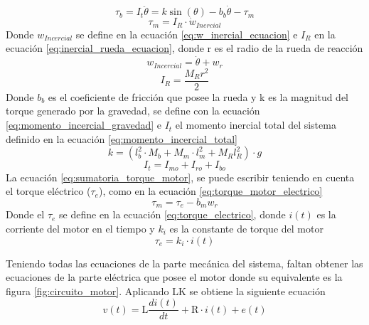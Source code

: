 \documentclass[conference]{IEEEtran}
\begin{document}
\begin{equation}
   \tau_b= I_{t}\ddot{\theta}= k \sin(\theta)-b_b \dot{\theta}-\tau_m
    \label{eq:sumatoria_torque_base}
\end{equation}
\begin{equation}
    \tau_m= I_{R} \cdot \dot{w}_{Inercial}
    \label{eq:sumatoria_torque_motor}
\end{equation}
Donde $w_{Incercial}$ se define en la ecuación \eqref{eq:w_inercial_ecuacion} e $I_R$  en la ecuación \eqref{eq:inercial_rueda_ecuacion}, donde r es el radio de la rueda de reacción
\begin{equation}
    w_{Incercial}=\dot{\theta}+w_r
    \label{eq:w_inercial_ecuacion}
\end{equation}
\begin{equation}
    I_R= \frac{M_R r^2}{2}
    \label{eq:inercial_rueda_ecuacion}
\end{equation}
Donde $b_b$ es el coeficiente de fricción que posee la rueda y k es la magnitud del torque generado por la gravedad, se define con la ecuación \eqref{eq:momento_incercial_gravedad} e $I_t$ el momento inercial total del sistema definido en la ecuación \eqref{eq:momento_incercial_total}
\begin{equation}
    k= (l_b^2\cdot M_b+M_m\cdot l_m^2+M_Rl_R^2)\cdot g
    \label{eq:momento_incercial_gravedad}
\end{equation}
\begin{equation}
    I_t=I_{mo}+I_{ro}+I_{bo}
    \label{eq:momento_incercial_total}
\end{equation}
La ecuación \eqref{eq:sumatoria_torque_motor}, se puede escribir teniendo en cuenta el torque eléctrico ($\tau_e$), como en la ecuación \eqref{eq:torque_motor_electrico}
\begin{equation}
 \tau_m=  \tau_e-b_m w_r 
    \label{eq:torque_motor_electrico}
\end{equation}
Donde el $\tau_e$ se define en la ecuación \eqref{eq:torque_electrico}, donde $i(t)$ es la corriente del motor en el tiempo y $k_i$ es la constante de torque del motor
\begin{equation}
    \tau_e=k_i \cdot i(t)
    \label{eq:torque_electrico}
\end{equation}

Teniendo todas las ecuaciones de la parte mecánica del sistema, faltan obtener las ecuaciones de la parte eléctrica que posee el motor donde su equivalente es la figura \ref{fig:circuito_motor}. Aplicando LK  se obtiene la siguiente ecuación
\begin{equation*}
    v(t)= \text{L}\frac{di(t)}{dt}+\text{R}\cdot i(t)+e(t)
\end{equation*}
\end{document}

